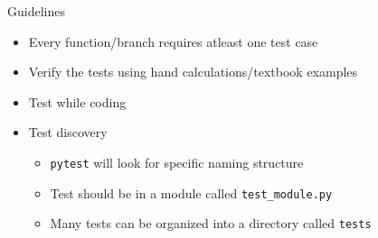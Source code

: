 \documentclass[11pt,professionalfonts]{beamer}
\begin{document}
\begin{frame}{Guidelines}
    \begin{itemize}
        \item Every function/branch requires atleast one test case
        \item Verify the tests using hand calculations/textbook examples
        \item Test while coding
        \item Test discovery
            \begin{itemize}
                \item \texttt{pytest} will look for specific naming structure
                \item Test should be in a module called \texttt{test_module.py}
                \item Many tests can be organized into a directory called \texttt{tests}
            \end{itemize}
    \end{itemize}
\end{frame}
\end{document}
